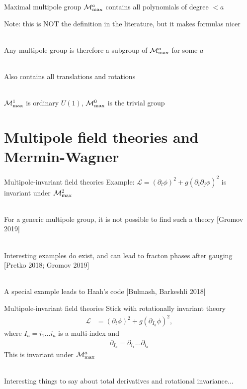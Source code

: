 \documentclass{beamer}
\renewcommand{\L}{\mathcal{L}}
\newcommand{\M}[1]{\mathcal{M}_{\rm max}^{#1}}
\begin{document}
\begin{frame}{Maximal multipole group}
$\M{a}$ contains all polynomials of degree $<a$

Note: this is NOT the definition in the literature, but it makes formulas nicer\\\

Any multipole group is therefore a subgroup of $\M{a}$ for some $a$\\\

Also contains all translations and rotations\\\

$\M{1}$ is ordinary $U(1)$, $\M{0}$ is the trivial group
\end{frame}

\section{Multipole field theories and Mermin-Wagner}

\begin{frame}{Multipole-invariant field theories}
Example: $\mathcal{L} = (\partial_t \phi)^2 + g (\partial_i \partial_j \phi)^2$ is invariant under $\M{2}$\\\

For a generic multipole group, it is not possible to find such a theory [Gromov 2019]\\\

Interesting examples do exist, and can lead to fracton phases after gauging [Pretko 2018; Gromov 2019]\\\

A special example leads to Haah's code [Bulmash, Barkeshli 2018]
\end{frame}

\begin{frame}{Multipole-invariant field theories}
Stick with rotationally invariant theory
\begin{align*}
\L &= (\partial_t \phi)^2 + g(\partial_{I_a} \phi)^2,
\end{align*}
where $I_a = i_1 \dots i_a$ is a multi-index and 
\begin{align*}
\partial_{I_a} = \partial_{i_1}\dots \partial_{i_a}
\end{align*}
This is invariant under $\M{a}$\\\

Interesting things to say about total derivatives and rotational invariance...
\end{frame}
\end{document}
